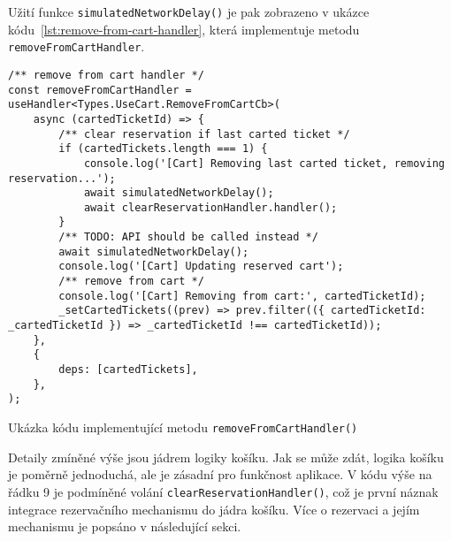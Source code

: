 Užití funkce \texttt{simulatedNetworkDelay()} je pak zobrazeno v ukázce kódu~\ref{lst:remove-from-cart-handler}, která implementuje metodu \texttt{removeFromCartHandler}.

\begin{listing}[H]
\begin{verbatim}
/** remove from cart handler */
const removeFromCartHandler = useHandler<Types.UseCart.RemoveFromCartCb>(
	async (cartedTicketId) => {
		/** clear reservation if last carted ticket */
		if (cartedTickets.length === 1) {
			console.log('[Cart] Removing last carted ticket, removing reservation...');
			await simulatedNetworkDelay();
			await clearReservationHandler.handler();
		}
		/** TODO: API should be called instead */
		await simulatedNetworkDelay();
		console.log('[Cart] Updating reserved cart');
		/** remove from cart */
		console.log('[Cart] Removing from cart:', cartedTicketId);
		_setCartedTickets((prev) => prev.filter(({ cartedTicketId: _cartedTicketId }) => _cartedTicketId !== cartedTicketId));
	},
	{
		deps: [cartedTickets],
	},
);
\end{verbatim}
\caption{Ukázka kódu implementující metodu \texttt{removeFromCartHandler()}}
\label{lst:remove-from-cart-handler}
\end{listing}

Detaily zmíněné výše jsou jádrem logiky košíku.
Jak se může zdát, logika košíku je poměrně jednoduchá, ale je zásadní pro funkčnost aplikace.
V kódu výše na řádku 9 je podmíněné volání \texttt{clearReservationHandler()}, což je první náznak integrace rezervačního mechanismu do jádra košíku.
Více o rezervaci a jejím mechanismu je popsáno v následující sekci.
